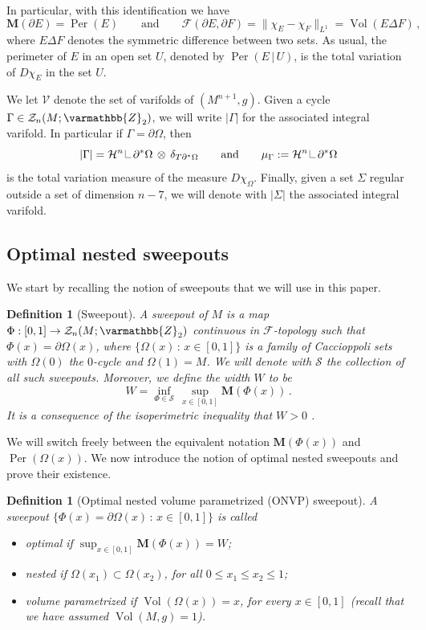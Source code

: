 \documentclass[12pt,twoside]{amsart}
\numberwithin{equation}{section}
\renewcommand{\leq}{\leqslant}
\renewcommand{\mathbb}{\varmathbb}
\newtheorem{definition}[theorem]{Definition}
\newcommand{\cF}{\mathcal F}
\renewcommand{\cH}{\mathcal H}
\newcommand{\cS}{\mathcal S}
\newcommand{\cV}{\mathcal V}
\newcommand{\bM}{\mathbf{M}}
\DeclareMathOperator{\Per}{Per}
\DeclareMathOperator{\Vol}{Vol}
\newcommand\res{\mathop{\hbox{\vrule height 7pt width .3pt depth 0pt
\vrule height .3pt width 5pt depth 0pt}}\nolimits}
\begin{document}
In particular, with this identification we have
$$
\bM(\partial E)=\Per(E)\qquad\text{and}\qquad \cF(\partial E, \partial F)=\| \chi_E -\chi_F\|_{L^1}=\Vol(E\Delta F)\,,
$$
where $E\Delta F$ denotes the symmetric difference between two sets. As usual, the perimeter of $E$ in an open set $U$, denoted by $\Per(E\,|\,U)$, is the total variation of $D\chi_E$ in the set $U$.

We let $\cV$ denote the set of varifolds of $(M^{n+1},g)$. Given a cycle $\Gamma\in \mathcal{Z}_{n}(M; \mathbb{Z}_2)$, we will write $|\Gamma|$ for the associated integral varifold. In particular if $\Gamma=\partial \Omega$, then 
$$
|\Gamma|=\cH^{n}\res \partial^*\Omega\,\otimes\, \delta_{T\partial^*\Omega}\qquad \text{and}\qquad
\mu_{\Gamma}:=\cH^{n}\res \partial^*\Omega
$$ 
is the total variation measure of the measure $D\chi_\Omega$. Finally, given a set $\Sigma$ regular outside a set of dimension $n-7$, we will denote with $|\Sigma|$ the associated integral varifold.

\subsection{Optimal nested sweepouts} We start by recalling the notion of sweepouts that we will use in this paper.

\begin{definition}[Sweepout]
	A sweepout of $M$ is a map $\Phi: [0,1] \rightarrow \mathcal{Z}_{n}(M; \mathbb{Z}_2)$ continuous in $\cF$-topology such that $\Phi(x) = \partial \Omega(x)$, where $\{\Omega(x) \,:\, x\in [0,1]\}$ is a family of Caccioppoli sets with $\Omega(0)$ the $0$-cycle and $\Omega(1) = M$.  We will denote with $\cS$ the collection of all such sweepouts.
	Moreover, we define the width $W$ to be
\[
W = \inf_{\Phi \in \cS} \,\sup_{x\in [0,1]} \bM(\Phi(x)) \,.
\]
	It is a consequence of the isoperimetric inequality that $W >0$ \cite[Proposition 0.5]{DL}.
\end{definition}

We will switch freely between the equivalent notation $\bM(\Phi(x))$ and $\Per(\Omega(x))$. We now  introduce the notion of optimal nested sweepouts and prove their existence.


\begin{definition}[Optimal nested volume parametrized (ONVP) sweepout]
	A sweepout $\{ \Phi(x) = \partial \Omega(x) \,:\, x\in[0,1]\}$ is called
	\begin{itemize}
		\item \textit{optimal} if $\sup_{x\in [0,1]} \bM(\Phi(x)) = W$;
		\item \textit{nested} if $\Omega(x_1) \subset \Omega(x_2)$, for all $0\leq x_1 \leq x_2\leq 1$;
		\item \textit{volume parametrized} if $\Vol(\Omega(x)) = x$, for every $x\in [0,1]$ (recall that we have assumed $\Vol(M,g) = 1$). 
	\end{itemize}
\end{definition}
\end{document}
